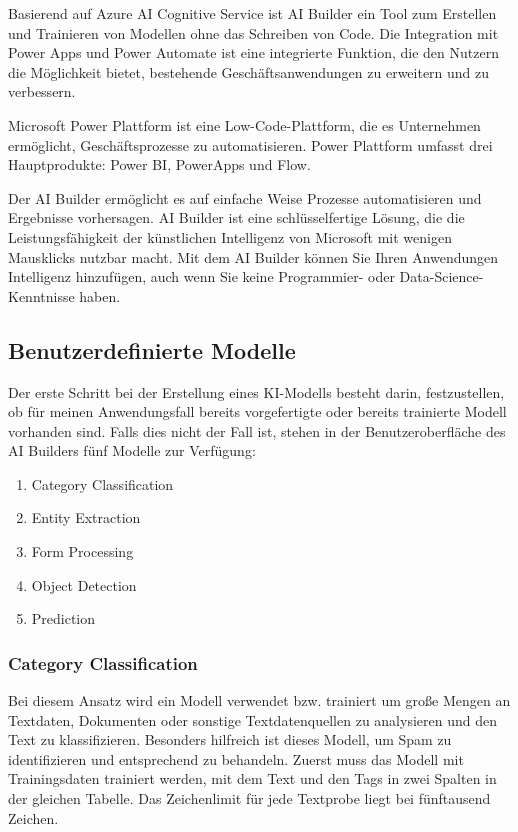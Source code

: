 Basierend auf Azure AI Cognitive Service ist AI Builder ein Tool zum Erstellen und Trainieren von Modellen ohne das Schreiben von Code. Die Integration mit Power Apps und Power Automate ist eine integrierte Funktion, die den Nutzern die Möglichkeit bietet, bestehende Geschäftsanwendungen zu erweitern und zu verbessern.

Microsoft Power Plattform ist eine Low-Code-Plattform, die es Unternehmen ermöglicht, Geschäftsprozesse zu automatisieren. Power Plattform umfasst drei Hauptprodukte: Power BI, PowerApps und Flow.

Der AI Builder ermöglicht es auf einfache Weise Prozesse automatisieren und Ergebnisse vorhersagen. AI Builder ist eine schlüsselfertige Lösung, die die Leistungsfähigkeit der künstlichen Intelligenz von Microsoft mit wenigen Mausklicks nutzbar macht. Mit dem AI Builder können Sie Ihren Anwendungen Intelligenz hinzufügen, auch wenn Sie keine Programmier- oder Data-Science-Kenntnisse haben.

\subsection{Benutzerdefinierte Modelle}

Der erste Schritt bei der Erstellung eines KI-Modells besteht darin, festzustellen, ob für meinen Anwendungsfall bereits vorgefertigte oder bereits trainierte Modell vorhanden sind. Falls dies nicht der Fall ist, stehen in der Benutzeroberfläche des AI Builders fünf Modelle zur Verfügung:

\begin{enumerate}
    \item Category Classification
    \item Entity Extraction
    \item Form Processing
    \item Object Detection
    \item Prediction
\end{enumerate}

\subsubsection{Category Classification}

Bei diesem Ansatz wird ein Modell verwendet bzw. trainiert um große Mengen an Textdaten, Dokumenten oder sonstige Textdatenquellen zu analysieren und den Text zu klassifizieren. Besonders hilfreich ist dieses Modell, um Spam zu identifizieren und entsprechend zu behandeln. Zuerst muss das Modell mit Trainingsdaten trainiert werden, mit dem Text und den Tags in zwei Spalten in der gleichen Tabelle. Das Zeichenlimit für jede Textprobe liegt bei fünftausend Zeichen.


